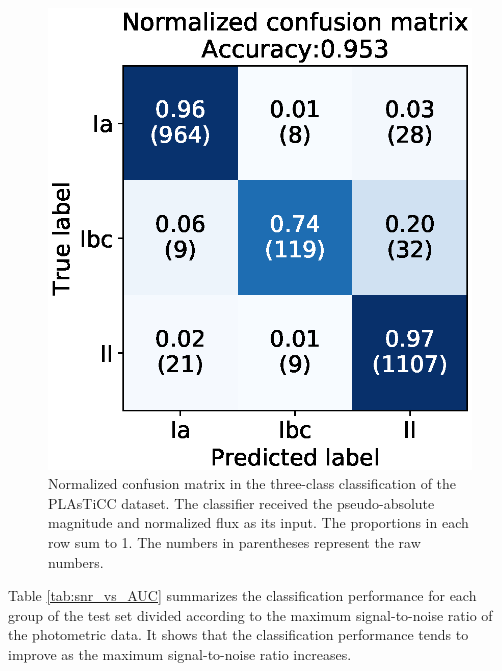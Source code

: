 \documentclass[proof]{pasj01}
\begin{document}
%
\begin{figure}[htbp]
  \begin{center}
     \includegraphics[width=\columnwidth]{figures/06_CM_abs-mag_scaled-flux_w-mixup_predictions_test_2.eps}
  \end{center}
  \caption{%
  Normalized confusion matrix in the three-class classification of the PLAsTiCC dataset. The classifier received the pseudo-absolute magnitude and normalized flux as its input. The proportions in each row sum to 1. The numbers in parentheses represent the raw numbers.
  }%
  \label{fig:plasticc_3class_CM}
\end{figure}
%
%
Table \ref{tab:snr_vs_AUC} summarizes the classification performance for each group of the test set divided according to the maximum signal-to-noise ratio of the photometric data.
It shows that the classification performance tends to improve as the maximum signal-to-noise ratio increases.
\end{document}

